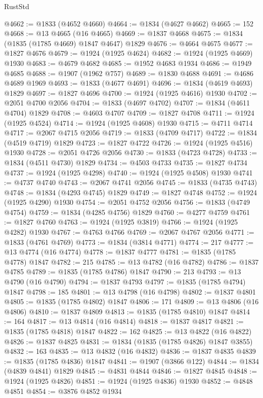 \begin{lexlean}{RustStd}
\begin{coremodule}
@4662 := @1833 (@4652 @4660)
@4664 := @1834 (@4627 @4662)
@4665 := 152
@4668 := @13 @4665 (@16 @4665)
@4669 := @1837 @4668
@4675 := @1834 (@1835 (@1785 @4669) @1847 @4647) @1829
@4676 := @4664 @4675
@4677 := @1827 @4676
@4679 := @1924 (@1925 @4624)
@4682 := @1924 (@1925 @4669) @1930
@4683 := @4679 @4682
@4685 := @1952 @4683 @1934
@4686 := @1949 @4685
@4688 := @1907 (@1962 @757)
@4689 := @1830 @4688
@4691 := @4686 @4689 @1969
@4693 := @1833 (@4677 @4691)
@4696 := @1834 (@4619 @4693) @1829
@4697 := @1827 @4696
@4700 := @1924 (@1925 @4616) @1930
@4702 := @2051 @4700 @2056
@4704 := @1833 (@4697 @4702)
@4707 := @1834 (@4611 @4704) @1829
@4708 := @4603 @4707
@4709 := @1827 @4708
@4711 := @1924 (@1925 @4524)
@4714 := @1924 (@1925 @4608) @1930
@4715 := @4711 @4714
@4717 := @2067 @4715 @2056
@4719 := @1833 (@4709 @4717)
@4722 := @1834 (@4519 @4719) @1829
@4723 := @1827 @4722
@4726 := @1924 (@1925 @4516) @1930
@4728 := @2051 @4726 @2056
@4730 := @1833 (@4723 @4728)
@4733 := @1834 (@4511 @4730) @1829
@4734 := @4503 @4733
@4735 := @1827 @4734
@4737 := @1924 (@1925 @4298)
@4740 := @1924 (@1925 @4508) @1930
@4741 := @4737 @4740
@4743 := @2067 @4741 @2056
@4745 := @1833 (@4735 @4743)
@4748 := @1834 (@4293 @4745) @1829
@4749 := @1827 @4748
@4752 := @1924 (@1925 @4290) @1930
@4754 := @2051 @4752 @2056
@4756 := @1833 (@4749 @4754)
@4759 := @1834 (@4285 @4756) @1829
@4760 := @4277 @4759
@4761 := @1827 @4760
@4763 := @1924 (@1925 @3819)
@4766 := @1924 (@1925 @4282) @1930
@4767 := @4763 @4766
@4769 := @2067 @4767 @2056
@4771 := @1833 (@4761 @4769)
@4773 := @1834 (@3814 @4771)
@4774 := 217
@4777 := @13 @4774 (@16 @4774)
@4778 := @1837 @4777
@4781 := @1835 (@1785 @4778) @1847
@4782 := 215
@4785 := @13 @4782 (@16 @4782)
@4786 := @1837 @4785
@4789 := @1835 (@1785 @4786) @1847
@4790 := 213
@4793 := @13 @4790 (@16 @4790)
@4794 := @1837 @4793
@4797 := @1835 (@1785 @4794) @1847
@4798 := 185
@4801 := @13 @4798 (@16 @4798)
@4802 := @1837 @4801
@4805 := @1835 (@1785 @4802) @1847
@4806 := 171
@4809 := @13 @4806 (@16 @4806)
@4810 := @1837 @4809
@4813 := @1835 (@1785 @4810) @1847
@4814 := 164
@4817 := @13 @4814 (@16 @4814)
@4818 := @1837 @4817
@4821 := @1835 (@1785 @4818) @1847
@4822 := 162
@4825 := @13 @4822 (@16 @4822)
@4826 := @1837 @4825
@4831 := @1834 (@1835 (@1785 @4826) @1847 @3855)
@4832 := 163
@4835 := @13 @4832 (@16 @4832)
@4836 := @1837 @4835
@4839 := @1835 (@1785 @4836) @1847
@4841 := @1907 (@3866 @122)
@4844 := @1834 (@4839 @4841) @1829
@4845 := @4831 @4844
@4846 := @1827 @4845
@4848 := @1924 (@1925 @4826)
@4851 := @1924 (@1925 @4836) @1930
@4852 := @4848 @4851
@4854 := @3876 @4852 @1934

\end{coremodule}
\end{lexlean}
